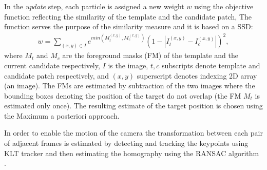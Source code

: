 In the \textit{update} step, each particle is assigned a new weight $w$ using the objective function reflecting the similarity of the template and the candidate patch, The function serves the purpose of the similarity measure and it is based on a SSD:
\begin{align} \label{eq:bgfg_distance_function}
	w = \sum_{(x,y) \in I}{e^{min(M_{t}^{(x,y)}, M_{c}^{(x,y)})}(1 - |I_{t}^{(x,y)} - I_{c}^{(x,y)}|)^{2}},
\end{align}
where $M_{t}$ and $M_{c}$ are the foreground masks (FM) of the template and the current candidate respectively, $I$ is the image, $t, c$ subscripts denote template and candidate patch respectively, and $(x,y)$ superscript denotes indexing 2D array (an image). The FMs are estimated by subtraction of the two images where the bounding boxes denoting the position of the target do not overlap (the FM $M_{t}$ is estimated only once). The resulting estimate of the target position is chosen using the Maximum a posteriori approach.

In order to enable the motion of the camera the transformation between each pair of adjacent frames is estimated by detecting and tracking the keypoints using KLT tracker \cite{Tomasi91detectionand} and then estimating the homography using the RANSAC algorithm \cite{Hartley:2003:MVG:861369}.

%
%

